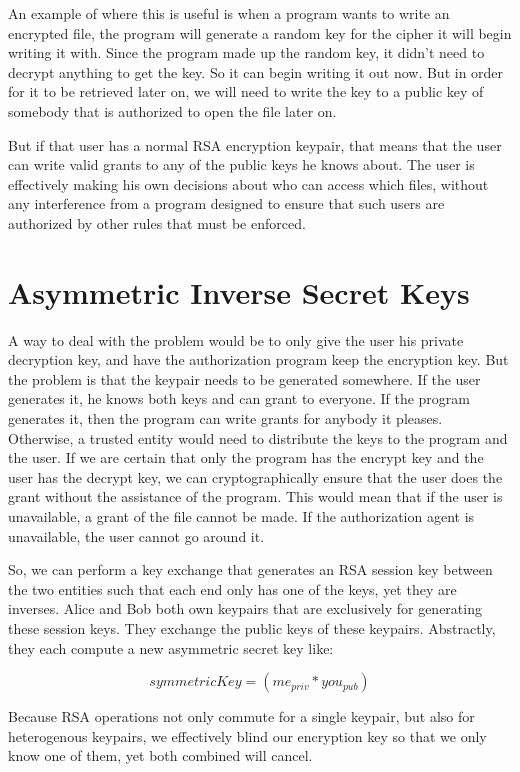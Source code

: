 \documentclass{article}
\begin{document}
An example of where this is useful is when a program wants to write an encrypted file, the program will generate a random key for the cipher it will begin writing it with.  Since the program made up the random key, it didn't need to decrypt anything to get the key.  So it can begin writing it out now.  But in order for it to be retrieved later on, we will need to write the key to a public key of somebody that is authorized to open the file later on.

But if that user has a normal RSA encryption keypair, that means that the user can write valid grants to any of the public keys he knows about.  The user is effectively making his own decisions about who can access which files, without any interference from a program designed to ensure that such users are authorized by other rules that must be enforced.  

\section{Asymmetric Inverse Secret Keys}

A way to deal with the problem would be to only give the user his private decryption key, and have the authorization program keep the encryption key.  But the problem is that the keypair needs to be generated somewhere.  If the user generates it, he knows both keys and can grant to everyone.  If the program generates it, then the program can write grants for anybody it pleases.  Otherwise, a trusted entity would need to distribute the keys to the program and the user.  If we are certain that only the program has the encrypt key and the user has the decrypt key, we can cryptographically ensure that the user does the grant without the assistance of the program.  This would mean that if the user is unavailable, a grant of the file cannot be made.  If the authorization agent is unavailable, the user cannot go around it.

So, we can perform a key exchange that generates an RSA session key between the two entities such that each end only has one of the keys, yet they are inverses.  Alice and Bob both own keypairs that are exclusively for generating these session keys.  They exchange the public keys of these keypairs.  Abstractly, they each compute a new asymmetric secret key like:

$$
symmetricKey = (me_{priv} * you_{pub})
$$

Because RSA operations not only commute for a single keypair, but also for heterogenous keypairs,
we effectively blind our encryption key so that we only know one of them, yet both combined will cancel.
\end{document}
